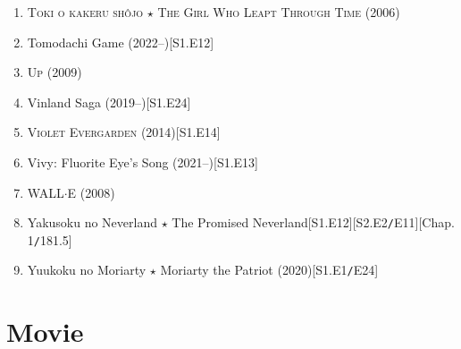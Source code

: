 \documentclass{article}
\numberwithin{equation}{section}
\begin{document}
\begin{enumerate}
    \item \textsc{Toki o kakeru sh\^ojo $\star$ The Girl Who Leapt Through Time} (2006)
    \item Tomodachi Game (2022--)\hfill[S1.E12]
    \item \textsc{Up} (2009)
    \item Vinland Saga (2019--)\hfill[S1.E24]
    \item \textsc{Violet Evergarden} (2014)\hfill[S1.E14]
    \item Vivy: Fluorite Eye's Song (2021--)\hfill[S1.E13]
    \item \textsc{WALL$\cdot$E} (2008)
    \item Yakusoku no Neverland $\star$ The Promised Neverland\hfill[S1.E12][S2.E2\texttt{/}E11][Chap. 1\texttt{/}181.5]
    \item Yuukoku no Moriarty $\star$ Moriarty the Patriot (2020)\hfill[S1.E1\texttt{/}E24]
\end{enumerate}


\section{Movie}
\end{document}
